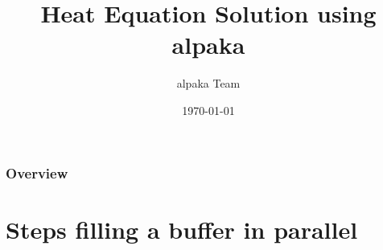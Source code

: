 \documentclass[9pt]{beamer}
\title{Heat Equation Solution using alpaka} %
\author{alpaka Team} %
\institute[HZDR] %
{
HZDR \\ %
\medskip
\textit{} %
}
\date{\today} %
\begin{document}
\begin{frame}
\titlepage %
\end{frame}


\begin{frame}
\frametitle{Overview} %
\tableofcontents %
\end{frame}

\section{Steps filling a buffer in parallel}
\end{document}
